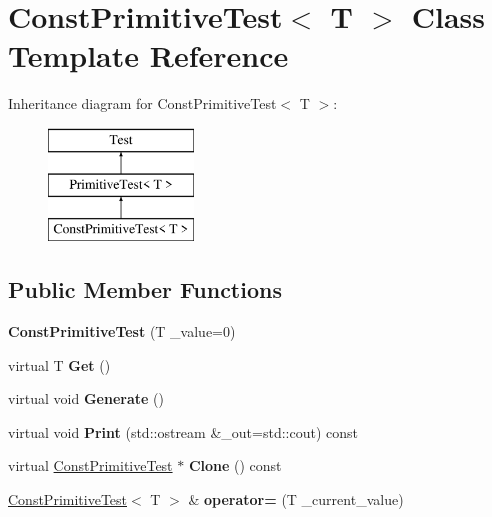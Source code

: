 \hypertarget{class_const_primitive_test}{}\section{Const\+Primitive\+Test$<$ T $>$ Class Template Reference}
\label{class_const_primitive_test}
Inheritance diagram for Const\+Primitive\+Test$<$ T $>$\+:\begin{figure}[H]
\begin{center}
\leavevmode
\includegraphics[height=3.000000cm]{class_const_primitive_test}
\end{center}
\end{figure}
\subsection*{Public Member Functions}
\begin{DoxyCompactItemize}
\item 
\mbox{\label{class_const_primitive_test_a34da605f489cab8f071ac3130916e67f}} 
{\bfseries Const\+Primitive\+Test} (T \+\_\+value=0)
\item 
\mbox{\label{class_const_primitive_test_a081b3449770c6d020bd1116e8ffdb293}} 
virtual T {\bfseries Get} ()
\item 
\mbox{\label{class_const_primitive_test_a121caecc26a0a3fb1ba72c5590ce2cf3}} 
virtual void {\bfseries Generate} ()
\item 
\mbox{\label{class_const_primitive_test_af9e8401d681d647cab2f154838bc387c}} 
virtual void {\bfseries Print} (std\+::ostream \&\+\_\+out=std\+::cout) const
\item 
\mbox{\label{class_const_primitive_test_a31b6a7a42f6e3677a71b1c9017ddb348}} 
virtual \hyperlink{class_const_primitive_test}{Const\+Primitive\+Test} $\ast$ {\bfseries Clone} () const
\item 
\mbox{\label{class_const_primitive_test_a5b834edb4d45951d0ea3d95238328c04}} 
\hyperlink{class_const_primitive_test}{Const\+Primitive\+Test}$<$ T $>$ \& {\bfseries operator=} (T \+\_\+current\+\_\+value)
\end{DoxyCompactItemize}
